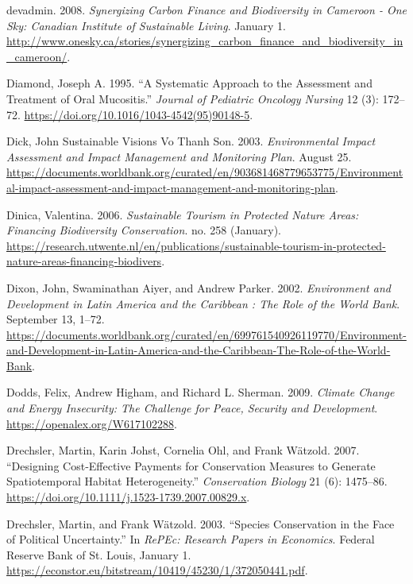 \begin{CSLReferences}{1}{1}
{devadmin}. 2008. \emph{Synergizing Carbon Finance and Biodiversity in
Cameroon - One Sky: Canadian Institute of Sustainable Living}. January
1.
\url{http://www.onesky.ca/stories/synergizing_carbon_finance_and_biodiversity_in_cameroon/}.

Diamond, Joseph A. 1995. {``A Systematic Approach to the Assessment and
Treatment of Oral Mucositis.''} \emph{Journal of Pediatric Oncology
Nursing} 12 (3): 172--72.
\url{https://doi.org/10.1016/1043-4542(95)90148-5}.

Dick, John Sustainable Visions Vo Thanh Son. 2003. \emph{Environmental
Impact Assessment and Impact Management and Monitoring Plan}. August 25.
\url{https://documents.worldbank.org/curated/en/903681468779653775/Environmental-impact-assessment-and-impact-management-and-monitoring-plan}.

Dinica, Valentina. 2006. \emph{Sustainable Tourism in Protected Nature
Areas: Financing Biodiversity Conservation}. no. 258 (January).
\url{https://research.utwente.nl/en/publications/sustainable-tourism-in-protected-nature-areas-financing-biodivers}.

Dixon, John, Swaminathan Aiyer, and Andrew Parker. 2002.
\emph{Environment and Development in Latin America and the Caribbean :
The Role of the World Bank}. September 13, 1--72.
\url{https://documents.worldbank.org/curated/en/699761540926119770/Environment-and-Development-in-Latin-America-and-the-Caribbean-The-Role-of-the-World-Bank}.

Dodds, Felix, Andrew Higham, and Richard L. Sherman. 2009. \emph{Climate
Change and Energy Insecurity: The Challenge for Peace, Security and
Development}. \url{https://openalex.org/W617102288}.

Drechsler, Martin, Karin Johst, Cornelia Ohl, and Frank Wätzold. 2007.
{``Designing Cost‐Effective Payments for Conservation Measures to
Generate Spatiotemporal Habitat Heterogeneity.''} \emph{Conservation
Biology} 21 (6): 1475--86.
\url{https://doi.org/10.1111/j.1523-1739.2007.00829.x}.

Drechsler, Martin, and Frank Wätzold. 2003. {``Species Conservation in
the Face of Political Uncertainty.''} In \emph{RePEc: Research Papers in
Economics}. Federal Reserve Bank of St. Louis, January 1.
\url{https://econstor.eu/bitstream/10419/45230/1/372050441.pdf}.


\end{CSLReferences}
